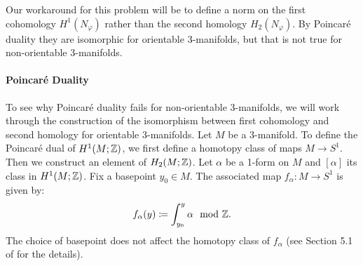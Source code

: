 Our workaround for this problem will be to define a norm on the first cohomology $H^1(N_{\varphi})$ rather than the second homology $H_2(N_{\varphi})$.
By Poincar\'e duality they are isomorphic for orientable 3-manifolds, but that is not true for non-orientable $3$-manifolds.

\paragraph{Poincar\'e Duality}
To see why Poincar\'e duality fails for non-orientable 3-manifolds, we will work through the construction of the isomorphism between first cohomology and second homology for orientable 3-manifolds.  Let $M$ be a 3-manifold.
To define the Poincar\'e dual of $H^1(M;\mathbb{Z})$, we first define a homotopy class of maps $M\rightarrow S^1$.  Then we construct an element of $H_2(M;\mathbb{Z})$.
Let $\alpha$ be a 1-form on $M$ and $[\alpha]$ its class in $H^1(M; \mathbb{Z})$.  Fix a basepoint $y_0\in M$.
The associated map $f_{\alpha}:M\rightarrow S^1$ is given by:
\begin{align}\label{form:map}
  f_{\alpha}(y) \coloneqq  \int_{y_0}^y \alpha \mod {\mathbb{Z}}.
\end{align}
The choice of basepoint does not affect the homotopy class of $f_\alpha$
(see Section 5.1 of \cite{calegari2007foliations} for the details).

